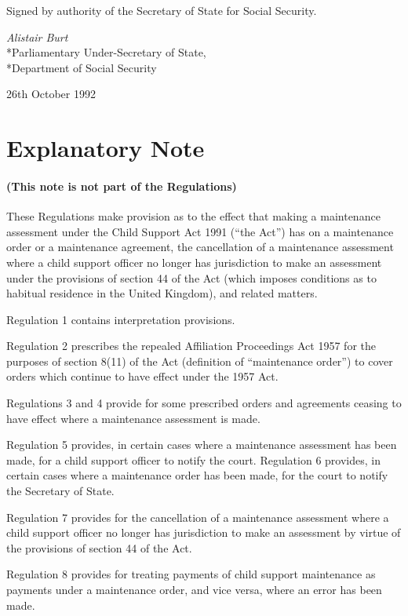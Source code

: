 \documentclass[12pt,a4paper]{article}
\begin{document}

\bigskip

Signed by authority of the Secretary of State for Social Security.

{\raggedleft
\emph{Alistair Burt}\\*Parliamentary Under-Secretary of State,\\*Department of Social Security

}

26th October 1992

\small

\part{Explanatory Note}

\renewcommand\parthead{--- Explanatory Note}

\subsection*{(This note is not part of the Regulations)}

 These Regulations make provision as to the effect that making a maintenance assessment under the Child Support Act 1991 (“the Act”) has on a maintenance order or a maintenance agreement, the cancellation of a maintenance assessment where a child support officer no longer has jurisdiction to make an assessment under the provisions of section 44 of the Act (which imposes conditions as to habitual residence in the United Kingdom), and related matters.

  Regulation 1 contains interpretation provisions.

  Regulation 2 prescribes the repealed Affiliation Proceedings Act 1957 for the purposes of section 8(11) of the Act (definition of “maintenance order”) to cover orders which continue to have effect under the 1957 Act.

  Regulations 3 and 4 provide for some prescribed orders and agreements ceasing to have effect where a maintenance assessment is made.

  Regulation 5 provides, in certain cases where a maintenance assessment has been made, for a child support officer to notify the court. Regulation 6 provides, in certain cases where a maintenance order has been made, for the court to notify the Secretary of State.

  Regulation 7 provides for the cancellation of a maintenance assessment where a child support officer no longer has jurisdiction to make an assessment by virtue of the provisions of section 44 of the Act.

  Regulation 8 provides for treating payments of child support maintenance as payments under a maintenance order, and vice versa, where an error has been made.
\end{document}
